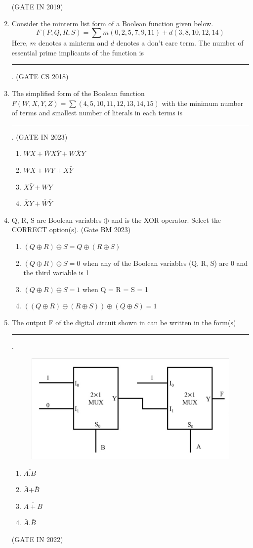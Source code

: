 \begin{enumerate}[label=\arabic*.,ref=\theenumi]
\begin{enumerate}
      \end{enumerate}
\hfill(GATE IN 2019)
\fi
  \item 
  \label{prob:gate  CS 49 }
 Consider the minterm list form of a Boolean function given below.$$F(P, Q, R, S) = \sum m(0, 2, 5, 7, 9, 11) + d(3, 8, 10, 12, 14)$$
 Here, $m$ denotes a minterm and $d$ denotes a don’t care term. The number of essential prime implicants of the function is \rule{1cm}{0.1pt}.
\hfill (GATE CS 2018)
%
 \item The simplified form of the Boolean function $F(W,X,Y,Z)=\sum(4,5,10,11,12,13,14,15)$ with the minimum number of terms and smallest number of literals in each terms is \rule{1cm}{0.1pt}.
 \hfill{(GATE IN 2023)}
	  \begin{enumerate}
		  \item $WX+\bar WX\bar Y+W\bar XY$
		   \item $WX+WY+X\bar Y$
		     \item $X\bar Y+WY$
		      \item$\bar XY+\bar W\bar Y$
	\end{enumerate}
%
\item Q, R, S are Boolean variables  $ \oplus$ and is the XOR operator. Select the CORRECT option(s).
\hfill{(Gate BM 2023)}
\begin{enumerate}
\item $(Q  \oplus  R)  \oplus  S = Q  \oplus  (R  \oplus  S) $
\item $(Q  \oplus  R)  \oplus  S = 0$ when any of the Boolean variables (Q, R, S) are 0 and the third variable is 1
\item $(Q  \oplus  R)  \oplus  S = 1$ when Q = R = S = 1
\item $((Q  \oplus  R)  \oplus  (R  \oplus  S))  \oplus  (Q  \oplus  S) = 1$
\end{enumerate}
%
\item The output F of the digital circuit shown 
	in 
	can be written in the form(s) \rule{1cm}{0.1pt}.
    \begin{figure}[H]
        \centering
        \includegraphics[width=0.75\columnwidth]{figs/gate_in_2022_q23.jpg}
        \caption{}
\label{fig:GATE IN 2022}
    \end{figure}
    \begin{enumerate}
        \item $\overline{A.B}$
        \item $\bar{A}$+$\bar{B}$
        \item $\overline{A + B}$
        \item $\bar{A}$.$\bar{B}$
    \end{enumerate}
    \hfill (GATE IN 2022)


\end{enumerate}

